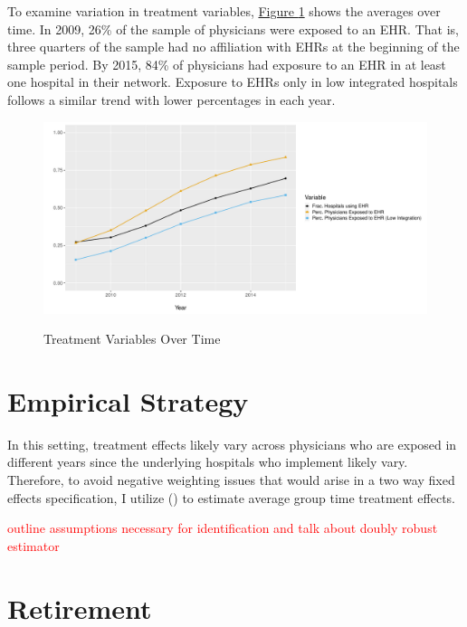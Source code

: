 \documentclass[11pt]{article}
\begin{document}
To examine variation in treatment variables, \hyperref[fig:figure1]{Figure \ref{fig:figure1}} shows the averages over time. In 2009, 26\% of the sample of physicians were exposed to an EHR. That is, three quarters of the sample had no affiliation with EHRs at the beginning of the sample period. By 2015, 84\% of physicians had exposure to an EHR in at least one hospital in their network. Exposure to EHRs only in low integrated hospitals follows a similar trend with lower percentages in each year. 

\vspace{5mm}
\begin{figure}[ht]
\centering
    \caption{Treatment Variables Over Time}
    \includegraphics[scale=.5]{Objects/sum_stats_year.pdf}
    \label{fig:figure1}
\end{figure}
\vspace{5mm}

\newpage

\section{Empirical Strategy}

In this setting, treatment effects likely vary across physicians who are exposed in different years since the underlying hospitals who implement likely vary. Therefore, to avoid negative weighting issues that would arise in a two way fixed effects specification, I utilize \citeauthor{callaway2021difference} (\citeyear{callaway2021difference}) to estimate average group time treatment effects. 

\textcolor{red}{outline assumptions necessary for identification and talk about doubly robust estimator}

\section{Retirement}
\end{document}
